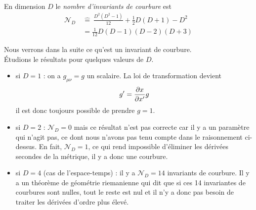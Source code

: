 \documentclass[a4paper,11pt]{report}
\begin{document}
            \begin{definition}
                En dimension $D$ le \textit{nombre d'invariants de courbure} est 
                \begin{align}
                    \mathscr{N}_D ~&\hat{=}~  \frac{D^2(D^2-1)}{12}+\frac{1}{2}D(D+1)-D^2\\
                &= \frac{1}{12}D(D-1)(D-2)(D+3)
                \end{align}
            \end{definition}
            Nous verrons dans la suite ce qu'est un invariant de courbure.\\
            Étudions le résultats pour quelques valeurs de $D$.
            \begin{itemize}[label = \textbullet]
                \item si $D=1$ : on a $g_{\mu\nu} = g$ un scalaire. La loi de transformation devient
                \begin{equation}
                    g' = \frac{\partial x}{\partial x'} g
                \end{equation}
                il est donc toujours possible de prendre $g=1$.
                \item si $D = 2$ : $\mathscr{N}_D = 0$ mais ce résultat n'est pas correcte car il y a un paramètre qui n'agit pas, ce dont nous n'avons pas tenu compte dans le raisonnement ci-dessus. En fait, $\mathscr{N}_D = 1$, ce qui rend impossible d'éliminer les dérivées secondes de la métrique, il y a donc une courbure.
                \item si $D=4$ (cas de l'espace-temps) : il y a $\mathscr{N}_D = 14$ invariants de courbure. Il y a un théorème de géométrie riemanienne qui dit que si ces 14 invariantes de courbures sont nulles, tout le reste est nul et il n'y a donc pas besoin de traiter les dérivées d'ordre plus élevé.
            \end{itemize}
            
\end{document}
